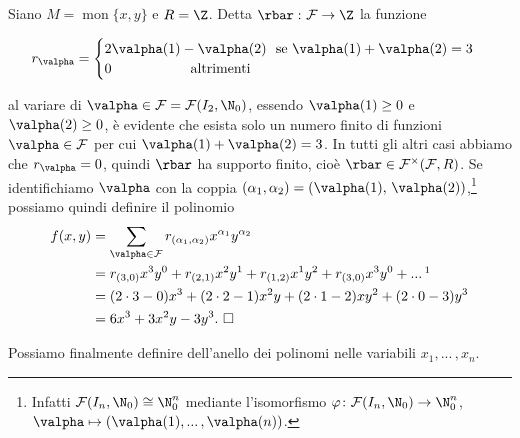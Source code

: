 \begin{exm}
  Siano $M=\operatorname{mon}\{x,y\}$ e $R=\Z$. Detta $\rbar\,\colon \mathcal{F}\to \Z$ la funzione 
    
  \[r_{\valpha} = \begin{cases}2\valpha(1)-\valpha(2) \text{ \ se } \valpha(1)+\valpha(2)=3 \\ 0 \text{ \ \ \ \ \ \ \ \ \ \ \ \ \ \ \ \ altrimenti}\end{cases}\] 

  \noindent al variare di $\valpha\in\mathcal{F}= \mathcal{F}(I_2,\N_0)$, essendo $\valpha(1)\geq 0$ e $\valpha(2)\geq 0$, 
  è evidente che esista solo un numero finito di funzioni $\valpha\in \mathcal{F}$ per cui $\valpha(1)+\valpha(2)=3$. 
  In tutti gli altri casi abbiamo che $r_{\valpha}=0$, quindi $\rbar$ ha supporto finito, cioè $\rbar\in\mathcal{F}^{\times}(\mathcal{F},R)$. 
  Se identifichiamo $\valpha$ con la coppia $(\alpha_1,\alpha_2)=(\valpha(1),\,\valpha(2))$,\footnote{
  Infatti $\mathcal{F}(I_n,\N_0)\cong \N_0^n$ mediante l'isomorfismo 
  $\varphi\colon \mathcal{F}(I_n,\N_0)\to \N_0^n$, $\valpha \mapsto (\valpha(1),...\,,\valpha(n))$.} 
  possiamo quindi definire il polinomio 
  \begin{align*}
    f(x,y) &= \sum\limits_{\valpha\in \mathcal{F}}r_{(\alpha_1,\alpha_2)} x^{\alpha_1}y^{\alpha_2} \\
    &= r_{(3,0)}x^3y^0+r_{(2,1)}x^2y^1+r_{(1,2)}x^1y^2+r_{(3,0)}x^3y^0+...\,\footnotemark \\ 
    &= (2\cdot 3-0)x^3+(2\cdot 2-1)x^2y+(2\cdot 1-2)xy^2+(2\cdot 0-3)y^3 \\ &= 6x^3+3x^2y-3y^3.\ \square
  \end{align*}
\end{exm}

\noindent Possiamo finalmente definire dell'anello dei polinomi nelle variabili $x_1,...\,,x_n$. 

